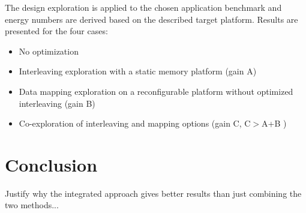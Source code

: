 \documentclass[prodmode,acmtodaes]{acmsmall}
\begin{document}
The design exploration is applied to the chosen application benchmark and energy numbers are derived based on the described target platform.
Results are presented for the four cases:
\begin{itemize}
\item No optimization
\item Interleaving exploration with a static memory platform (gain A)
\item Data mapping exploration on a reconfigurable platform without optimized interleaving (gain B)
\item Co-exploration of interleaving and mapping options (gain C, C$ > $A+B )
\end{itemize}

\section{Conclusion}

Justify why the integrated approach gives better results than just combining the two methods...


\end{document}
